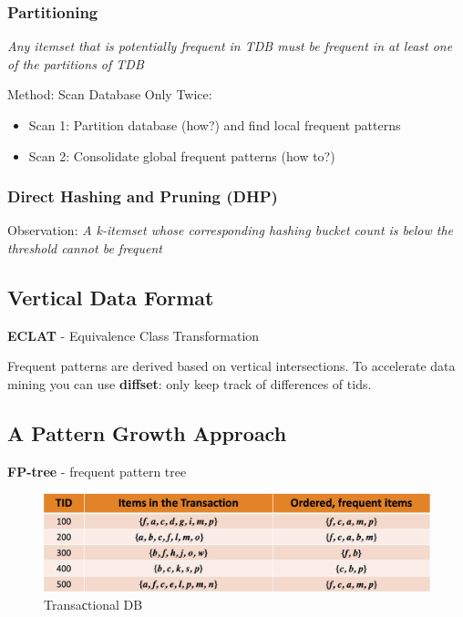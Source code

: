 \subsubsection{Partitioning}
\begin{theorem}
\textit{Any itemset that is potentially frequent in TDB must be frequent in at least one of the partitions of TDB}
\end{theorem}

Method: Scan Database Only Twice:
\begin{itemize}
\item Scan 1: Partition database (how?) and find local frequent patterns
\item Scan 2: Consolidate global frequent patterns (how to?)
\end{itemize}

\subsubsection{Direct Hashing and Pruning (DHP)}
Observation: \textit{A k-itemset whose corresponding hashing bucket count is below the threshold cannot be frequent}

\subsection{Vertical Data Format}\label{eclat}
\textbf{ECLAT} - Equivalence Class Transformation

Frequent patterns are derived based on vertical intersections. To accelerate data mining you can use \textbf{diffset}: only keep track of differences of tids.

\subsection{A Pattern Growth Approach}\label{fpgrowth}
\textbf{FP-tree} - frequent pattern tree

\begin{figure}[H]
    \centering
    \includegraphics[width=\linewidth]{transactional_db.png}
    \caption{Transaсtional DB}
\end{figure}

